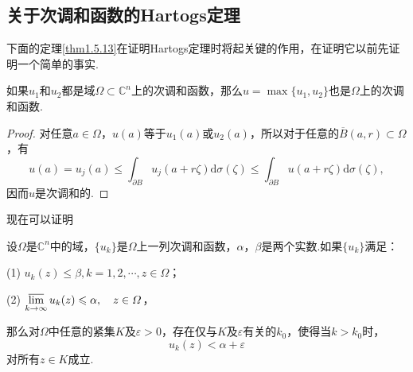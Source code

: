 \subsection{关于次调和函数的Hartogs定理}
下面的定理\ref{thm1.5.13}在证明Hartogs定理时将起关键的作用，在证明它以前先证明一个简单的事实.
\begin{prop}\label{prop1.5.12}
	如果$u_1$和$u_2$都是域$\Omega\subset\mathbb{C}^n$上的次调和函数，那么$u=\max\{u_1,u_2\}$也是$\Omega$上的次调和函数.
\end{prop}
\begin{proof}
	对任意$a\in\Omega$，$u(a)$等于$u_1(a)$或$u_2(a)$，所以对于任意的$\overline{B}(a,r)\subset\Omega$，有
	\[u(a)= u_j(a)\le\int_{\partial B}u_j(a+r\zeta)\mathrm{d}\sigma(\zeta)\le\int_{\partial B}u(a+r\zeta)\mathrm{d}\sigma(\zeta),\]
	因而$u$是次调和的.
\end{proof}
现在可以证明
\begin{theorem}\label{thm1.5.13}
	设$\Omega$是$\mathbb{C}^n$中的域，$\{u_k\}$是$\Omega$上一列次调和函数，$\alpha$，$\beta$是两个实数.如果$\{u_k\}$满足：
	
	(1)\hypertarget{1.5.13}{}
	$u_k(z)\le\beta,k=1,2,\cdots,z\in\Omega$；
	
	(2)\hypertarget{1.5.13}{}
	$\varlimsup\limits_{k\to\infty}u_k(z)\le\alpha,\quad z\in\Omega$，
	
	那么对$\Omega$中任意的紧集$K$及$\varepsilon>0$，存在仅与$K$及$\varepsilon$有关的$k_0$，使得当$k>k_0$时，
	\[u_k(z)<\alpha+\varepsilon\]
	对所有$z\in K$成立.
\end{theorem}
